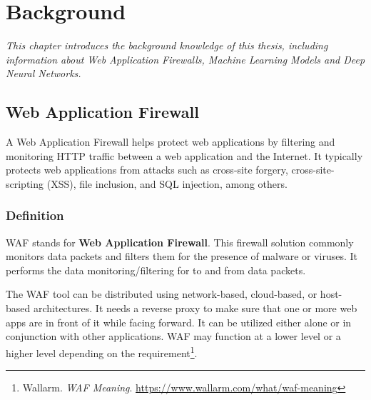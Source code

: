 
\chapter{Background}
\label{chap:background}
\textit{\hspace{0.5cm}This chapter introduces the background knowledge of this thesis, including information about Web Application Firewalls, Machine Learning Models and Deep Neural Networks.}
\minitoc

\section{Web Application Firewall} 
\label{sec:waf}
\hspace{0.5cm}A Web Application Firewall helps protect web applications by filtering and monitoring HTTP traffic between a web application and the Internet. It typically protects web applications from attacks such as cross-site forgery, cross-site-scripting (XSS), file inclusion, and SQL injection, among others. 
\subsection{Definition}
\label{subsec:waf_def}
\hspace{0.5cm}WAF stands for \textbf{Web Application Firewall}. This firewall solution commonly monitors data packets and filters them for the presence of malware or viruses. It performs the data monitoring/filtering for to and from data packets.  

The WAF tool can be distributed using network-based, cloud-based, or host-based architectures. It needs a reverse proxy to make sure that one or more web apps are in front of it while facing forward. It can be utilized either alone or in conjunction with other applications. WAF may function at a lower level or a higher level depending on the requirement\footnote{\label{wallarm} Wallarm. \textit{WAF Meaning}. \url{https://www.wallarm.com/what/waf-meaning}}.


